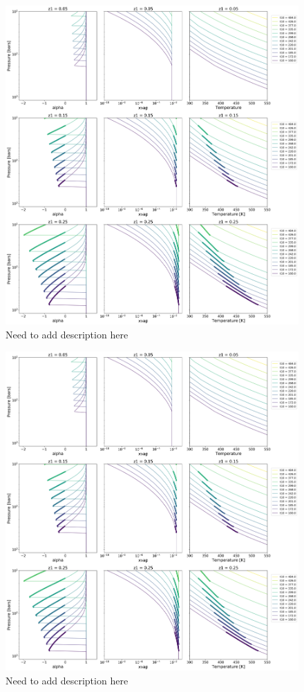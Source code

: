 \documentclass[11pt]{ucscthesisbs}
\begin{document}
\begin{figure}[ht!]
 \centerline{
  \includegraphics[width=7.0in]{figures/convection_inhibited_2.png}
 }
\caption[Inhibition of convection on Uranus]
{Need to add description here }
\label{fig:uranus}
\end{figure}
\begin{figure}[ht!]
 \centerline{
  \includegraphics[width=7.0in]{figures/convection_inhibited_2.png}
 }
\caption[Inhibition of convection on Neptune]
{Need to add description here }
\label{fig:neptune}
\end{figure}
\end{document}
